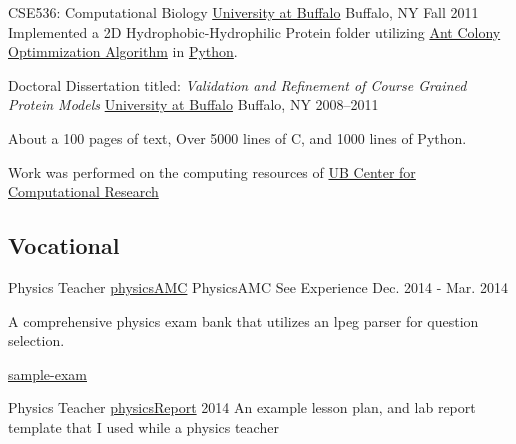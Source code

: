 \begin{cventries}
  \cventry
    {CSE536: Computational Biology}
    {\href{www.buffalo.edu}{University at Buffalo}}
    {Buffalo, NY}
    {Fall 2011}
	{Implemented a 2D Hydrophobic-Hydrophilic Protein folder utilizing \href{https://en.wikipedia.org/wiki/Ant_colony_optimization_algorithms}{Ant Colony Optimmization Algorithm} in \href{www.python.org}{Python}.}

  \cventry
    {Doctoral Dissertation titled: \emph{Validation and Refinement of Course Grained Protein Models}}
    {\href{www.buffalo.edu}{University at Buffalo}}
    {Buffalo, NY}
    {2008--2011}
{
\begin{cvitems}
\item {About a 100 pages of text, Over 5000 lines of C, and 1000 lines of Python.}
\item {Work was performed on the computing resources of \href{ccr.buffalo.edu}{UB Center for Computational Research}}
\end{cvitems}
}

\subsection{Vocational}

  \cventry
    {Physics Teacher} %
    {\href{https://github.com/jphafner/physicsAMC}{physicsAMC}}
    {PhysicsAMC} %
    {See Experience}
    {Dec. 2014 - Mar. 2014} %
{
\begin{cvitems}
    \item {A comprehensive physics exam bank that utilizes an lpeg parser for question selection.}
    \item { \href{https://github.com/jphafner/physicsAMC/blob/mc-project/kinematics-exam/sample-exam.pdf}{sample-exam}}
\end{cvitems}
}

  \cventry
    {Physics Teacher} %
    {\href{https://github.com/jphafner/physicsReport}{physicsReport}}
    {2014}
    {An example lesson plan, and lab report template that I used while a physics teacher}


\end{cventries}

